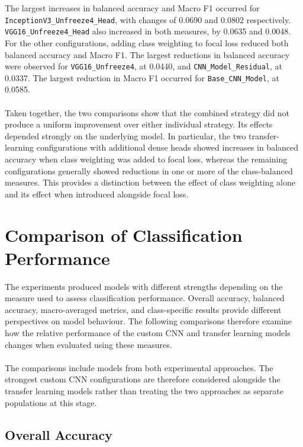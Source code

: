 \documentclass[12pt, a4paper]{report}
\let\oldsection\section
\renewcommand{\section}{%
    \Needspace{6\baselineskip}%
    \oldsection
}
\let\oldsubsection\subsection
\renewcommand{\subsection}{%
    \Needspace{6\baselineskip}%
    \oldsubsection
}
\begin{document}
				The largest increases in balanced accuracy and Macro F1 occurred for \\\texttt{InceptionV3\_Unfreeze4\_Head}, with changes of 0.0690 and 0.0802 respectively. \texttt{VGG16\_Unfreeze4\_Head} also increased in both measures, by 0.0635 and 0.0048. For the other configurations, adding class weighting to focal loss reduced both balanced accuracy and Macro F1. The largest reductions in balanced accuracy were observed for \texttt{VGG16\_Unfreeze4}, at 0.0440, and \texttt{CNN\_Model\_Residual}, at 0.0337. The largest reduction in Macro F1 occurred for \texttt{Base\_CNN\_Model}, at 0.0585.\\\\
				Taken together, the two comparisons show that the combined strategy did not produce a uniform improvement over either individual strategy. Its effects depended strongly on the underlying model. In particular, the two transfer-learning configurations with additional dense heads showed increases in balanced accuracy when class weighting was added to focal loss, whereas the remaining configurations generally showed reductions in one or more of the class-balanced measures. This provides a distinction between the effect of class weighting alone and its effect when introduced alongside focal loss.
				
		\section{Comparison of Classification Performance}
			
			The experiments produced models with different strengths depending on the measure used to assess classification performance. Overall accuracy, balanced accuracy, macro-averaged metrics, and class-specific results provide different perspectives on model behaviour. The following comparisons therefore examine how the relative performance of the custom CNN and transfer learning models changes when evaluated using these measures.\\\\
			The comparisons include models from both experimental approaches. The strongest custom CNN configurations are therefore considered alongside the transfer learning models rather than treating the two approaches as separate populations at this stage.\\
			
			\newpage
			\subsection{Overall Accuracy}
				
\end{document}
